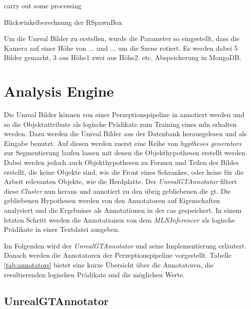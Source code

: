 \begin{algorithm}[H]
\begin{algorithmic}
\STATE carry out some processing
\ENDFOR
\end{algorithmic}
\caption{Blickwinkelberechnung der RSpawnBox}
\end{algorithm}

 \par

Um die Unreal Bilder zu erstellen, wurde die Parameter so eingestellt, dass die Kamera auf einer Höhe von ... und ... um die Szene rotiert. Es werden dabei 5 Bilder gemacht, 3 aus Höhe1 zwei aus Höhe2. etc.    Abspeicherung in MongoDB.

\section{Analysis Engine}
\label{sec:analysisengine}
Die Unreal Bilder können  von einer Perzeptionspipeline in \robosherlock annotiert werden und so die Objektattribute als logische Prädikate zum Training eines \gls{mln} erhalten werden. Dazu werden die Unreal Bilder aus der Datenbank herausgelesen und als Eingabe benutzt. Auf diesen werden zuerst eine Reihe von \textit{hyptheses generators} zur Segmentierung laufen lassen mit denen die Objekthypothesen erstellt werden. Dabei werden jedoch auch Objekthypothesen zu Formen und Teilen des Bildes erstellt, die keine Objekte sind, wie die Front eines Schrankes, oder keine für die Arbeit relevanten Objekte, wie die Herdplatte. Der \textit{UnrealGTAnnotator} filtert diese \textit{Cluster} nun heraus und annotiert zu den übrig gebliebenen die \gls{gt}. Die gebliebenen Hypothesen werden von den Annotatoren auf Eigenschaften analysiert und die Ergebnisse als Annotationen in der \gls{cas} gespeichert. In einem letzten Schritt werden die Annotationen von dem \textit{MLNInferencer} als logische Prädikate in einer Textdatei ausgeben. \par 

Im Folgenden wird der \textit{UnrealGTAnnotator} und seine Implementierung erläutert. Danach werden die Annotatoren der Perzeptionspipeline vorgestellt. Tabelle \ref{tab:annotators} bietet eine kurze Übersicht über die Annotatoren, die resultierenden logischen Prädikate und die möglichen Werte.

\subsection{UnrealGTAnnotator}


